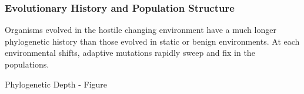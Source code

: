\subsubsection{Evolutionary History and Population Structure}

Organisms evolved in the hostile changing environment have a much longer phylogenetic history than those evolved in static or benign environments. At each environmental shifts, adaptive mutations rapidly sweep and fix in the populations.

Phylogenetic Depth - Figure





